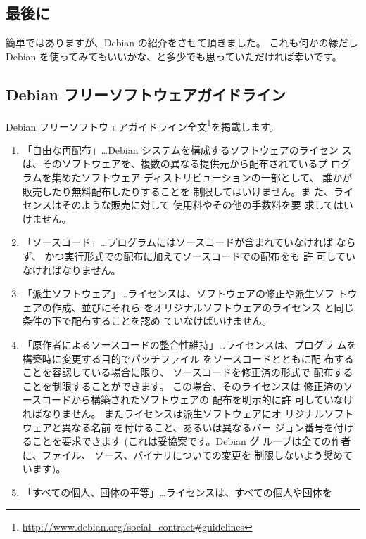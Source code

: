 \documentclass[mingoth,a4paper]{jsarticle}
\begin{document}
\subsection{最後に}
簡単ではありますが、Debian の紹介をさせて頂きました。
これも何かの縁だし Debian を使ってみてもいいかな、と多少でも思っていただければ幸いです。

\subsection{Debian フリーソフトウェアガイドライン}
Debian フリーソフトウェアガイドライン全文\footnote{\url{http://www.debian.org/social\_contract\#guidelines}}を掲載します。

 {\small
\begin{enumerate}
 \item 「自由な再配布」…Debian システムを構成するソフトウェアのライセン
       スは、そのソフトウェアを、複数の異なる提供元から配布されているプ
       ログラムを集めたソフトウェア ディストリビューションの一部として、
       誰かが販売したり無料配布したりすることを 制限してはいけません。ま
       た、ライセンスはそのような販売に対して 使用料やその他の手数料を要
       求してはいけません。
 \item 「ソースコード」…プログラムにはソースコードが含まれていなければ
       ならず、 かつ実行形式での配布に加えてソースコードでの配布をも 許
       可していなければなりません。
 \item 「派生ソフトウェア」…ライセンスは、ソフトウェアの修正や派生ソフ
       トウェアの作成、並びにそれら をオリジナルソフトウェアのライセンス
       と同じ条件の下で配布することを認め ていなけばいけません。
 \item 「原作者によるソースコードの整合性維持」…ライセンスは、プログラ
       ムを構築時に変更する目的でパッチファイル をソースコードとともに配
       布することを容認している場合に限り、 ソースコードを修正済の形式で
       配布することを制限することができます。 この場合、そのライセンスは
       修正済のソースコードから構築されたソフトウェアの 配布を明示的に許
       可していなければなりません。 またライセンスは派生ソフトウェアにオ
       リジナルソフトウェアと異なる名前 を付けること、あるいは異なるバー
       ジョン番号を付けることを要求できます (これは妥協案です。Debian グ
       ループは全ての作者に、ファイル、 ソース、バイナリについての変更を
       制限しないよう奨めています)。
 \item 「すべての個人、団体の平等」…ライセンスは、すべての個人や団体を

\end{enumerate}}
\end{document}
